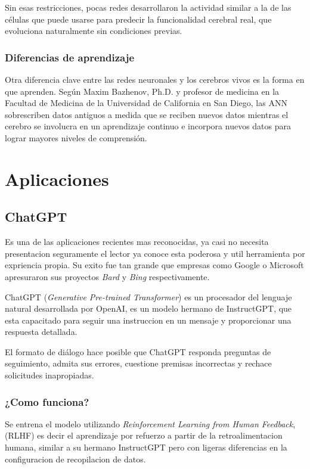\documentclass[runningheads]{llncs} %
\begin{document}
Sin esas restricciones, pocas redes desarrollaron la actividad similar a la de las células 
que puede usarse para predecir la funcionalidad cerebral real, que evoluciona naturalmente 
sin condiciones previas. \cite{NNvsANN}

\subsubsection{Diferencias de aprendizaje} 
Otra diferencia clave entre las redes neuronales y los cerebros vivos es la forma 
en que aprenden. Según Maxim Bazhenov, Ph.D. y profesor de medicina en la 
Facultad de Medicina de la Universidad de California en San Diego, 
las ANN sobrescriben datos antiguos a medida que se reciben nuevos datos mientras 
el cerebro se involucra en un aprendizaje continuo e incorpora nuevos datos para lograr 
mayores niveles de comprensión. \cite{NNvsANN}

\newpage
\section{Aplicaciones}
\subsection{ChatGPT}
Es una de las aplicaciones recientes mas reconocidas, ya casi no necesita presentacion
seguramente el lector ya conoce esta poderosa y util herramienta por expriencia propia.
Su exito fue tan grande que empresas como Google o Microsoft apresuraron sus proyectos
\textit{Bard} y \textit{Bing} respectivamente.

ChatGPT (\textit{Generative Pre-trained Transformer}) es un procesador del lenguaje natural
desarrollada por OpenAI, es un modelo hermano de InstructGPT, que esta capacitado
para seguir una instruccion en un mensaje y proporcionar una respuesta detallada.
\cite{ej-chatgpt}

El formato de diálogo hace posible que ChatGPT responda preguntas de seguimiento, 
admita sus errores, cuestione premisas incorrectas y rechace solicitudes inapropiadas.


\subsubsection{¿Como funciona?}
Se entrena el modelo utilizando \textit{Reinforcement Learning from Human Feedback}, 
(RLHF) es decir el aprendizaje por refuerzo a partir de la retroalimentacion humana,
similar a su hermano InstructGPT pero con ligeras diferencias en la configuracion de
recopilacion de datos. \cite{ej-chatgpt}
\end{document}
